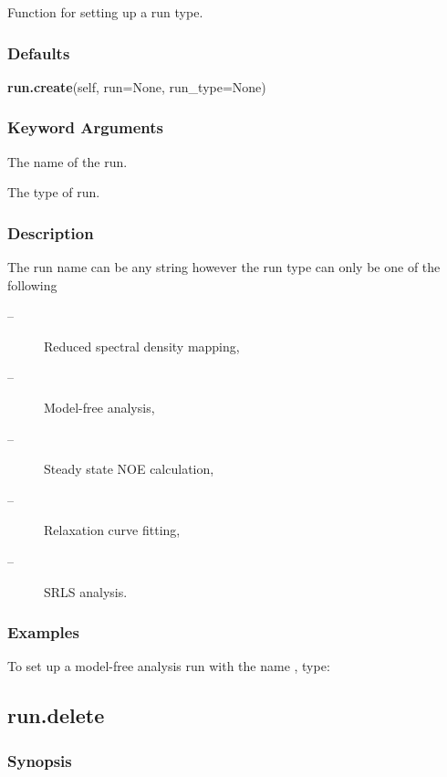 Function for setting up a run type.

\subsubsection{Defaults}

\textsf{\textbf{run.create}(self, run=None, run\_type=None)}


\subsubsection{Keyword Arguments}


  The name of the run.

  The type of run.

\subsubsection{Description}

The run name can be any string however the run type can only be one of the following

\begin{description}
\item[    
 --]   Reduced spectral density mapping,
\item[    
 --]   Model-free analysis,
\item[    
 --]   Steady state NOE calculation,
\item[    
 --]   Relaxation curve fitting,
\item[    
 --]   SRLS analysis.
\end{description}


\subsubsection{Examples}

To set up a model-free analysis run with the name 
, type:




\newpage

\subsection{run.delete}


\subsubsection{Synopsis}

